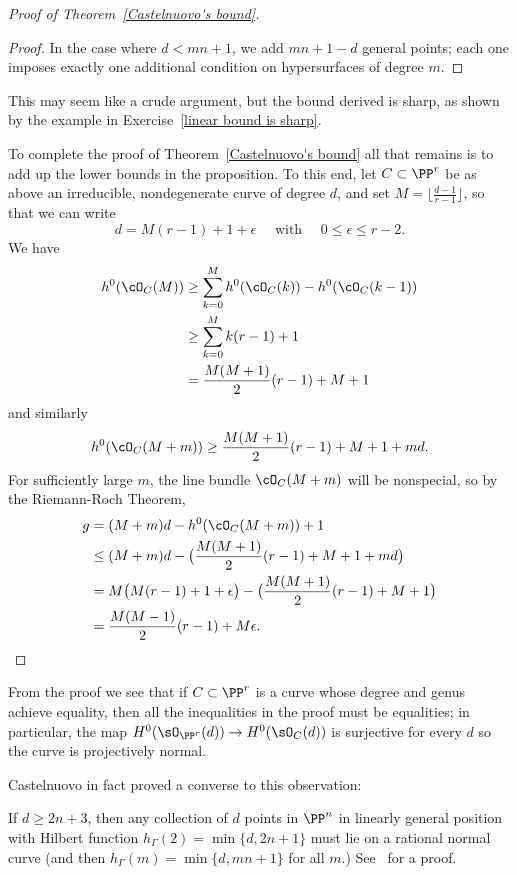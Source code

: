 \begin{proof}[Proof of Theorem~\ref{Castelnuovo's bound}]
\begin{proof}
In the case where $d<mn+1$, we add $mn+1-d$ general points; each one imposes exactly one
additional condition on hypersurfaces of degree $m$.
\end{proof}

This may seem like a crude argument, but the bound derived is sharp, as shown by the example in Exercise~\ref{linear bound is sharp}.

To complete the proof of Theorem~\ref{Castelnuovo's bound} all that remains is to add up the lower bounds in the proposition. To this end, let $C \subset \PP^r$ be as above an irreducible, nondegenerate curve of degree $d$, and set $M = \lfloor{\frac{d-1}{r-1}}\rfloor$, so that we can write
$$
d = M(r-1) + 1 + \epsilon \quad \text{ with } \quad 0 \leq \epsilon \leq r-2.
$$
We have 
\begin{align*}
h^0(\cO_C(M)) &\geq \sum_{k=0}^M h^0(\cO_C(k)) - h^0(\cO_C(k-1)) \\
&\geq  \sum_{k=0}^M k(r-1)+1 \\
&= \frac{M(M+1)}{2}(r-1) + M + 1
\end{align*}
and similarly
$$
h^0(\cO_C(M+m)) \geq \frac{M(M+1)}{2}(r-1) + M + 1 + md.
$$
For sufficiently large $m$, the line bundle $\cO_C(M+m)$ will be nonspecial, so by the Riemann-Roch Theorem,
\begin{align*}
g &= (M+m)d - h^0(\cO_C(M+m)) + 1 \\
&\leq (M+m)d - \bigl(  \frac{M(M+1)}{2}(r-1) + M + 1 + md \bigr) \\
& = M\bigl( M(r-1) + 1 + \epsilon \bigr) - \bigl(  \frac{M(M+1)}{2}(r-1) + M + 1 \bigr) \\
&= \frac{M(M-1)}{2}(r-1) + M\epsilon.
\end{align*}
 \end{proof}

From the proof we see that if  $C\subset \PP^r$ is a curve whose degree and genus achieve equality, then all the inequalities in the proof
must be equalities; in particular, the map $H^0(\sO_{\PP^r}(d)) \to H^0(\sO_C(d))$ is surjective for every $d$ so the curve is
projectively normal.


Castelnuovo in fact proved a converse to this observation:

\begin{fact}
If $d \geq 2n+3$, then any collection of $d$ points in $\PP^n$ in linearly general position with Hilbert function $h_\Gamma(2) = \min\{d, 2n+1\}$ must lie on a rational normal curve (and then $h_\Gamma(m) = \min\{d, mn+1\}$ for all $m$.) See~\cite[Lemma 3.9]{MR685427} for a proof.
\end{fact}
 

